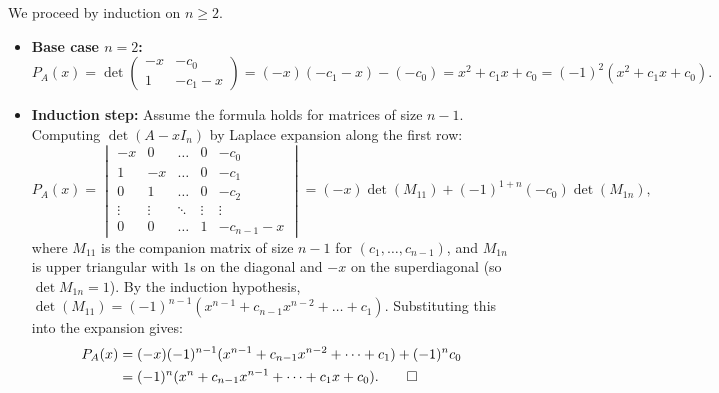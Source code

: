 \begin{exercisesolution}
\label{sol:char_poly_companion_matrix}
We proceed by induction on $n \ge 2$.
\begin{itemize}
    \item \textbf{Base case $n = 2$:}
    \[
    P_A(x) = \det \begin{pmatrix} -x & -c_0 \\ 1 & -c_1 - x \end{pmatrix} = (-x)(-c_1 - x) - (-c_0) = x^2 + c_1 x + c_0 = (-1)^2(x^2 + c_1 x + c_0).
    \]
    \item \textbf{Induction step:} Assume the formula holds for matrices of size $n - 1$.
    Computing $\det(A - x I_n)$ by Laplace expansion along the first row:
    \[
    P_A(x) = \begin{vmatrix}
      -x & 0 & \dots & 0 & -c_0 \\
      1 & -x & \dots & 0 & -c_1 \\
      0 & 1 & \dots & 0 & -c_2 \\
      \vdots & \vdots & \ddots & \vdots & \vdots \\
      0 & 0 & \dots & 1 & -c_{n-1} - x
    \end{vmatrix}
    = (-x) \det(M_{11}) + (-1)^{1+n}(-c_0) \det(M_{1n}),
    \]
    where $M_{11}$ is the companion matrix of size $n-1$ for $(c_1, \dots, c_{n-1})$, and $M_{1n}$ is upper triangular with $1$s on the diagonal and $-x$ on the superdiagonal (so $\det M_{1n} = 1$).
    By the induction hypothesis, $\det(M_{11}) = (-1)^{n-1}(x^{n-1} + c_{n-1}x^{n-2} + \dots + c_1)$.
    Substituting this into the expansion gives:
    \begin{align*}
    P_A(x) &= (-x)(-1)^{n-1}(x^{n-1} + c_{n-1}x^{n-2} + \dots + c_1) + (-1)^n c_0 \\
    &= (-1)^n (x^n + c_{n-1}x^{n-1} + \dots + c_1 x + c_0). \qedhere
    \end{align*}
\end{itemize}
\end{exercisesolution}
